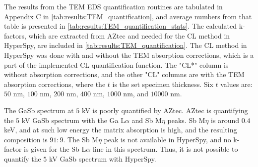 The results from the TEM EDS quantification routines are tabulated in \hyperref[appendix:tables]{Appendix C} in \cref{tab:results:TEM_quantification}, and average numbers from that table is presented in \cref{tab:results:TEM_quantification_stats}.
The calculated k-factors, which are extracted from AZtec and needed for the CL method in HyperSpy, are included in \cref{tab:results:TEM_quantification}.
The CL method in HyperSpy was done with and without the TEM absorption corrections, which is a part of the implemented CL quantification function.
The "CL*" column is without absorption corrections, and the other "CL" columns are with the TEM absorption corrections, where the $t$ is the set specimen thickness.
Six $t$ values are: $50$ nm, $100$ nm, $200$ nm, $400$ nm, $1000$ nm, and $10000$ nm.


The GaSb spectrum at $5$ kV is poorly quantified by AZtec.
AZtec is quantifying the $5$ kV GaSb spectrum with the Ga L$\alpha$ and Sb M$\eta$ peaks.
Sb M$\eta$ is around $0.4$ keV, and at such low energy the matrix absorption is high, and the resulting composition is $91:9$.
The Sb M$\eta$ peak is not available in HyperSpy, and no k-factor is given for the Sb L$\alpha$ line in this spectrum.
Thus, it is not possible to quantify the $5$ kV GaSb spectrum with HyperSpy.



